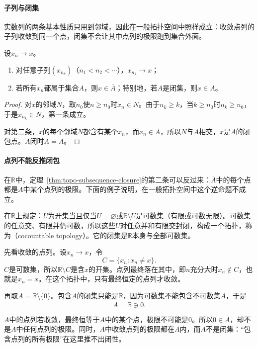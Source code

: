 \paragraph{子列与闭集}
实数列的两条基本性质只用到邻域，因此在一般拓扑空间中照样成立：收敛点列的子列收敛到同一个点，闭集不会让其中点列的极限跑到集合外面。

\begin{theorem}[子列与闭包]
\label{thm:topo-subsequence-closure}
设$x_n\to x$。
\begin{enumerate}
  \item 对任意子列$(x_{n_k})$（$n_1<n_2<\cdots$），$x_{n_k}\to x$；
  \item 若所有$x_n$都属于集合$A$，则$x\in\overline A$；特别地，若$A$是闭集，则$x\in A$。
\end{enumerate}
\end{theorem}
\begin{proof}
对$x$的邻域$N$，取$n_0$使$n\geq n_0$时$x_n\in N$。由于$n_k\geq k$，当$k\geq n_0$时$n_k\geq n_0$，于是$x_{n_k}\in N$，第一条成立。

对第二条，$x$的每个邻域$N$都含有某个$x_n$，而$x_n\in A$，所以$N$与$A$相交，$x$是$A$的闭包点。$A$闭时$\overline A=A$。
\end{proof}

\paragraph{点列不能反推闭包}
在$\mathbb R$中，定理~\ref{thm:topo-subsequence-closure}的第二条可以反过来：$\overline A$中的每个点都是$A$中某个点列的极限。下面的例子说明，在一般拓扑空间中这个逆命题不成立。

\begin{example}[余可数拓扑]
\label{ex:topo-cocountable}
在$\mathbb R$上规定：$U$为开集当且仅当$U=\varnothing$或$\mathbb R\setminus U$是可数集（有限或可数无限）。可数集的任意交、有限并仍可数，所以这些$U$对任意并和有限交封闭，构成一个拓扑，称为（cocountable topology）。它的闭集是$\mathbb R$本身与全部可数集。

先看收敛的点列。设$x_n\to x$，令
\[
 C=\{x_n:x_n\neq x\}.
\]
$C$是可数集，所以$\mathbb R\setminus C$是含$x$的开集。点列最终落在其中，即$n$充分大时$x_n\notin C$，也就是$x_n=x$。在这个拓扑中，只有最终恒定的点列才收敛。

再取$A=\mathbb R\setminus\{0\}$。包含$A$的闭集只能是$\mathbb R$，因为可数集不能包含不可数集$A$，于是
\[
 \overline A=\mathbb R\ni0.
\]

$A$中的点列若收敛，最终恒等于$A$中的某个点，极限不可能是$0$。所以$0\in\overline A$，却不是$A$中任何点列的极限。同时，$A$中收敛点列的极限都在$A$内，而$A$不是闭集：“包含点列的所有极限”在这里推不出闭性。
\end{example}


